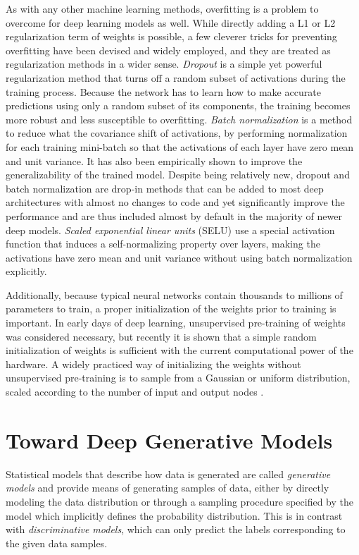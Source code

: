 As with any other machine learning methods, overfitting is a problem to overcome for deep learning models as well.
While directly adding a L1 or L2 regularization term of weights is possible, a few cleverer tricks for preventing overfitting have been devised and widely employed, and they are treated as regularization methods in a wider sense.
\emph{Dropout} \cite{srivastava2014dropout} is a simple yet powerful regularization method that turns off a random subset of activations during the training process.
Because the network has to learn how to make accurate predictions using only a random subset of its components, the training becomes more robust and less susceptible to overfitting.
\emph{Batch normalization} \cite{ioffe2015batchnorm} is a method to reduce what the covariance shift of activations, by performing normalization for each training mini-batch so that the activations of each layer have zero mean and unit variance.
It has also been empirically shown to improve the generalizability of the trained model.
Despite being relatively new, dropout and batch normalization are drop-in methods that can be added to most deep architectures with almost no changes to code and yet significantly improve the performance and are thus included almost by default in the majority of newer deep models.
\emph{Scaled exponential linear units} (SELU) \cite{klambauer2017selu} use a special activation function that induces a self-normalizing property over layers, making the activations have zero mean and unit variance without using batch normalization explicitly.


Additionally, because typical neural networks contain thousands to millions of parameters to train, a proper initialization of the weights prior to training is important.
In early days of deep learning, unsupervised pre-training of weights \cite{bengio2007greedy,erhan2010pretraining} was considered necessary, but recently it is shown that a simple random initialization of weights is sufficient with the current computational power of the hardware.
A widely practiced way of initializing the weights without unsupervised pre-training is to sample from a Gaussian or uniform distribution, scaled according to the number of input and output nodes \cite{glorot2010initialization,he2015prelu}.


\section{Toward Deep Generative Models}

Statistical models that describe how data is generated are called \emph{generative models} and provide means of generating samples of data, either by directly modeling the data distribution or through a sampling procedure specified by the model which implicitly defines the probability distribution.
This is in contrast with \emph{discriminative models}, which can only predict the labels corresponding to the given data samples.

